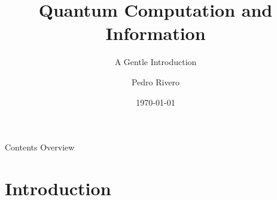 \documentclass[9pt, handout, aspectratio=169]{beamer}	%
\title{Quantum Computation and Information}
\subtitle{A Gentle Introduction}
\author{Pedro Rivero}
\institute{Illinois Institute of Technology \\ Argonne National Laboratory}
\date{\today}
\begin{document}
	\justify
	\setlength{\abovedisplayskip}{0pt}
	\setlength{\belowdisplayskip}{12pt}
	\setlength{\abovedisplayshortskip}{0pt}
	\setlength{\belowdisplayshortskip}{12pt}

\begin{frame}[plain,t]
	\titlepage
\end{frame}

\begin{frame}[c]{Contents Overview}
	\tableofcontents
\end{frame}



\section{Introduction}
\end{document}
